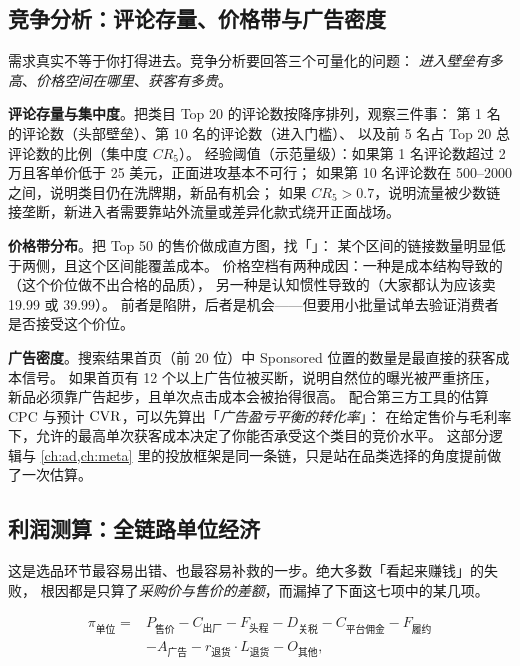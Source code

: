 \subsection{竞争分析：评论存量、价格带与广告密度}

需求真实不等于你打得进去。竞争分析要回答三个可量化的问题：
\emph{进入壁垒有多高}、\emph{价格空间在哪里}、\emph{获客有多贵}。

\textbf{评论存量与集中度}。把类目 Top 20 的评论数按降序排列，观察三件事：
第 1 名的评论数（头部壁垒）、第 10 名的评论数（进入门槛）、
以及前 5 名占 Top 20 总评论数的比例（集中度 $CR_5$）。
经验阈值（示范量级）：如果第 1 名评论数超过 2 万且客单价低于 25 美元，正面进攻基本不可行；
如果第 10 名评论数在 500--2000 之间，说明类目仍在洗牌期，新品有机会；
如果 $CR_5 > 0.7$，说明流量被少数链接垄断，新进入者需要靠站外流量或差异化款式绕开正面战场。

\textbf{价格带分布}。把 Top 50 的售价做成直方图，找「」：
某个区间的链接数量明显低于两侧，且这个区间能覆盖成本。
价格空档有两种成因：一种是成本结构导致的（这个价位做不出合格的品质），
另一种是认知惯性导致的（大家都认为应该卖 19.99 或 39.99）。
前者是陷阱，后者是机会——但要用小批量试单去验证消费者是否接受这个价位。

\textbf{广告密度}。搜索结果首页（前 20 位）中 Sponsored 位置的数量是最直接的获客成本信号。
如果首页有 12 个以上广告位被买断，说明自然位的曝光被严重挤压，
新品必须靠广告起步，且单次点击成本会被抬得很高。
配合第三方工具的估算 CPC 与预计 $\operatorname{CVR}$，可以先算出「\emph{广告盈亏平衡的转化率}」：
在给定售价与毛利率下，允许的最高单次获客成本决定了你能否承受这个类目的竞价水平。
这部分逻辑与 \cref{ch:ad,ch:meta} 里的投放框架是同一条链，只是站在品类选择的角度提前做了一次估算。

\subsection{利润测算：全链路单位经济}

这是选品环节最容易出错、也最容易补救的一步。绝大多数「看起来赚钱」的失败，
根因都是只算了\emph{采购价与售价的差额}，而漏掉了下面这七项中的某几项。

\begin{equation}
\begin{aligned}
\pi_{\text{单位}} ={}& P_{\text{售价}} - C_{\text{出厂}} - F_{\text{头程}} - D_{\text{关税}} - C_{\text{平台佣金}}
 - F_{\text{履约}} \\
 &- A_{\text{广告}} - r_{\text{退货}}\cdot L_{\text{退货}} - O_{\text{其他}} ,
\end{aligned}
\label{eq:unitecon}
\end{equation}

